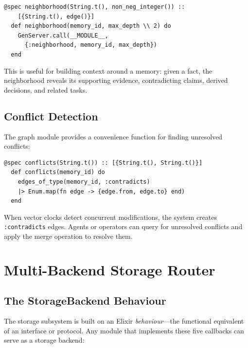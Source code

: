 \documentclass[12pt,a4paper]{article}
\theoremstyle{definition}
\begin{document}
\begin{lstlisting}[caption={Neighborhood query: local subgraph extraction.}, label={lst:neighborhood}]
  @spec neighborhood(String.t(), non_neg_integer()) ::
    [{String.t(), edge()}]
  def neighborhood(memory_id, max_depth \\ 2) do
    GenServer.call(__MODULE__,
      {:neighborhood, memory_id, max_depth})
  end
\end{lstlisting}

This is useful for building context around a memory: given a fact, the neighborhood reveals its supporting evidence, contradicting claims, derived decisions, and related tasks.

\subsection{Conflict Detection}\label{subsec:conflict-detection}

The graph module provides a convenience function for finding unresolved conflicts:

\begin{lstlisting}[caption={Detecting unresolved conflicts via contradicts edges.}, label={lst:conflicts}]
  @spec conflicts(String.t()) :: [{String.t(), String.t()}]
  def conflicts(memory_id) do
    edges_of_type(memory_id, :contradicts)
    |> Enum.map(fn edge -> {edge.from, edge.to} end)
  end
\end{lstlisting}

When vector clocks detect concurrent modifications, the system creates \texttt{:contradicts} edges.
Agents or operators can query for unresolved conflicts and apply the merge operation to resolve them.

\section{Multi-Backend Storage Router}\label{sec:storage}

\subsection{The StorageBackend Behaviour}\label{subsec:storage-behaviour}

The storage subsystem is built on an Elixir \emph{behaviour}---the functional equivalent of an interface or protocol.
Any module that implements these five callbacks can serve as a storage backend:
\end{document}
